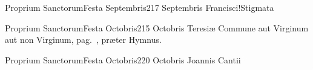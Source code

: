 \documentclass[psalterium-tridentinum.tex]{subfiles}
\begin{document}
	{Proprium Sanctorum}{Festa Septembris}{2}{17 Septembris}
	{}{}{Francisci!Stigmata}
	{}
	{}

	{Proprium Sanctorum}{Festa Octobris}{2}{15 Octobris}
	{}{}{Teresiæ}
	{Commune aut Virginum aut non Virginum, pag.\ \pageref{M-MU}, præter Hymnus.}
	{}

	{Proprium Sanctorum}{Festa Octobris}{2}{20 Octobris}
	{}{}{Joannis Cantii}
	{}
	{}
\end{document}
